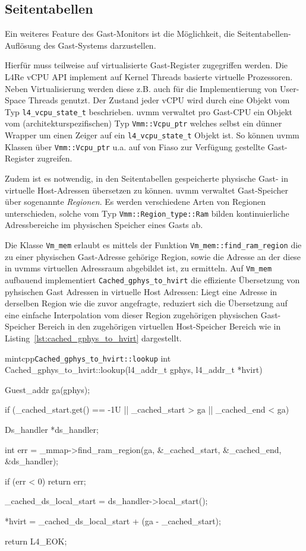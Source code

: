 \subsection{Seitentabellen}

Ein weiteres Feature des Gast-Monitors ist die Möglichkeit,
die Seitentabellen-Auflösung des Gast-Systems darzustellen.

Hierfür muss teilweise auf virtualisierte Gast-Register zugegriffen werden.
Die L4Re vCPU API implement auf Kernel Threads basierte virtuelle Prozessoren.
Neben Virtualisierung werden diese z.B. auch für die Implementierung von
User-Space Threads genutzt. Der Zustand jeder vCPU wird durch eine Objekt vom
Typ \texttt{l4\_vcpu\_state\_t} beschrieben. uvmm verwaltet pro Gast-CPU ein
Objekt vom (architekturspezifischen) Typ \texttt{Vmm::Vcpu\_ptr} welches selbst
ein dünner Wrapper um einen Zeiger auf ein \texttt{l4\_vcpu\_state\_t} Objekt
ist.  So können uvmm Klassen über \texttt{Vmm::Vcpu\_ptr} u.a. auf von Fiaso
zur Verfügung gestellte Gast-Register zugreifen.

Zudem ist es notwendig, in den Seitentabellen gespeicherte physische Gast- in
virtuelle Host-Adressen übersetzen zu können. uvmm verwaltet Gast-Speicher über
sogenannte \textit{Regionen}. Es werden verschiedene Arten von Regionen
unterschieden, solche vom Typ \texttt{Vmm::Region\_type::Ram} bilden
kontinuierliche Adressbereiche im physischen Speicher eines Gasts ab.

Die Klasse \texttt{Vm\_mem} erlaubt es mittels der Funktion
\texttt{Vm\_mem::find\_ram\_region} die zu einer physischen Gast-Adresse
gehörige Region, sowie die Adresse an der diese in uvmms virtuellen
Adressraum abgebildet ist, zu ermitteln. Auf \texttt{Vm\_mem} aufbauend
implementiert \texttt{Cached\_gphys\_to\_hvirt} die effiziente Übersetzung von
pyhsischen Gast Adressen in virtuelle Host Adressen: Liegt eine Adresse in
derselben Region wie die zuvor angefragte, reduziert sich die Übersetzung auf
eine einfache Interpolation vom dieser Region zugehörigen physischen
Gast-Speicher Bereich in den zugehörigen virtuellen Host-Speicher Bereich wie
in Listing~\ref{lst:cached_gphys_to_hvirt} dargestellt.

\begin{mintlisting}[label=lst:cached_gphys_to_hvirt]{mintcpp}{\texttt{Cached\_gphys\_to\_hvirt::lookup}}
int Cached_gphys_to_hvirt::lookup(l4_addr_t gphys, l4_addr_t *hvirt)
{
  Guest_addr ga(gphys);

  if (_cached_start.get() == -1U || _cached_start > ga || _cached_end < ga)
    {
      Ds_handler *ds_handler;

      int err = _mmap->find_ram_region(ga, &_cached_start, &_cached_end, &ds_handler);

      if (err < 0)
        return err;

      _cached_ds_local_start = ds_handler->local_start();
    }

  *hvirt = _cached_ds_local_start + (ga - _cached_start);

  return L4_EOK;
}

\end{mintlisting}

